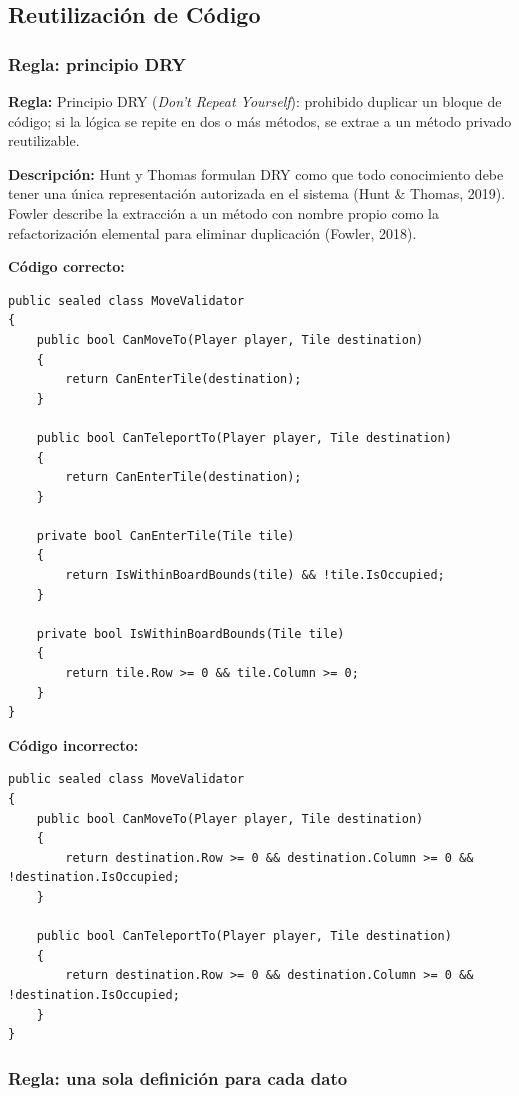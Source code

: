 \subsection{Reutilización de Código}

\subsubsection{Regla: principio DRY}

\textbf{Regla:} Principio DRY (\emph{Don't Repeat Yourself}): prohibido duplicar un bloque de código; si la lógica se repite en dos o más métodos, se extrae a un método privado reutilizable.

\textbf{Descripción:} Hunt y Thomas formulan DRY como que todo conocimiento debe tener una única representación autorizada en el sistema (Hunt \& Thomas, 2019). Fowler describe la extracción a un método con nombre propio como la refactorización elemental para eliminar duplicación (Fowler, 2018).

\textbf{Código correcto:}
\begin{lstlisting}[style=csharpstyle]
public sealed class MoveValidator
{
    public bool CanMoveTo(Player player, Tile destination)
    {
        return CanEnterTile(destination);
    }

    public bool CanTeleportTo(Player player, Tile destination)
    {
        return CanEnterTile(destination);
    }

    private bool CanEnterTile(Tile tile)
    {
        return IsWithinBoardBounds(tile) && !tile.IsOccupied;
    }

    private bool IsWithinBoardBounds(Tile tile)
    {
        return tile.Row >= 0 && tile.Column >= 0;
    }
}
\end{lstlisting}

\textbf{Código incorrecto:}
\begin{lstlisting}[style=csharpstyle]
public sealed class MoveValidator
{
    public bool CanMoveTo(Player player, Tile destination)
    {
        return destination.Row >= 0 && destination.Column >= 0 && !destination.IsOccupied;
    }

    public bool CanTeleportTo(Player player, Tile destination)
    {
        return destination.Row >= 0 && destination.Column >= 0 && !destination.IsOccupied;
    }
}
\end{lstlisting}

\subsubsection{Regla: una sola definición para cada dato}


